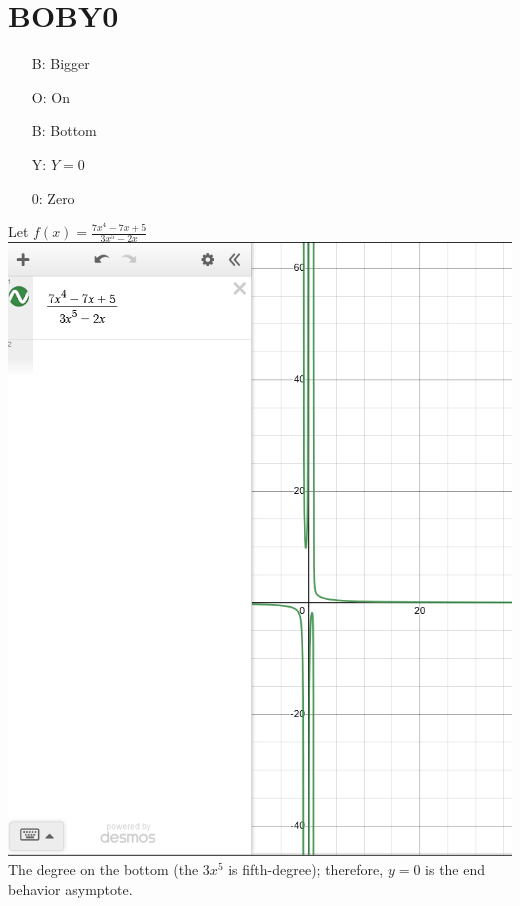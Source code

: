 \documentclass[11pt]{article}
\begin{document}
\section{BOBY0}
\begin{enumerate}[]
    \item[B:] Bigger
    \item[O:] On
    \item[B:] Bottom
    \item[Y:] $Y=0$
    \item[0:] Zero
\end{enumerate}

Let $f(x)=\frac{7x^4-7x+5}{3x^5-2x}$\\
\includegraphics[scale=0.25]{bobyo.png}\\
The degree on the bottom (the $3x^5$ is fifth-degree); therefore, $y=0$ is the end behavior asymptote.
\end{document}
